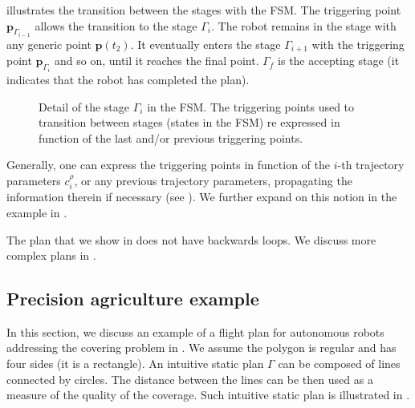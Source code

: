  illustrates the transition between the stages with the FSM. The triggering point $\mathbf{p}_{\Gamma_{i-1}}$ allows the transition to the stage $\Gamma_i$. The robot remains in the stage with any generic point $\mathbf{p}(t_2)$. It eventually enters the stage $\Gamma_{i+1}$ with the triggering point $\mathbf{p}_{\Gamma_i}$ and so on, until it reaches the final point. $\Gamma_f$ is the accepting stage (it indicates that the robot has completed the plan).

\begin{figure}[h]
  \center
\caption[Detail of a stage in the FSM]{Detail of the stage $\Gamma_i$ in the FSM. The triggering points used to transition between stages (states in the FSM) re expressed in function of the last and/or previous triggering points.}
\label{fig:state-machine2}
\end{figure}
    
Generally, one can express the triggering points in function of the $i$-th trajectory parameters $c_{i}^{\rho}$, or any previous trajectory parameters, propagating the information therein if necessary (see ). We further expand on this notion in the example in .

The plan that we show in  does not have backwards loops. We discuss more complex plans in . 

\subsection{Precision agriculture example}
\label{sec:flight-plan}

In this section, we discuss an example of a flight plan for autonomous robots addressing the covering problem in . We assume the polygon is regular and has four sides (it is a rectangle). An intuitive static plan $\Gamma$ can be composed of lines connected by circles. The distance between the lines can be then used as a measure of the quality of the coverage. Such intuitive static plan is illustrated in .

